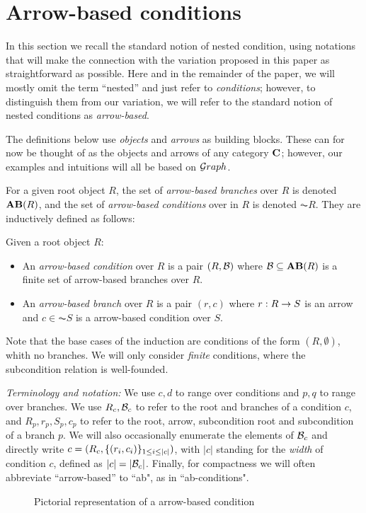 \section{Arrow-based conditions}
 
In this section we recall the standard notion of nested condition, using notations that will make the connection with the variation proposed in this paper as straightforward as possible. Here and in the remainder of the paper, we will mostly omit the term ``nested'' and just refer to \emph{conditions}; however, to distinguish them from our variation, we will refer to the standard notion of nested conditions as \emph{arrow-based}.

The definitions below use \emph{objects} and \emph{arrows} as building blocks. These can for now be thought of as the objects and arrows of any category $\mathbf{C}$; however, our examples and intuitions will all be based on ${\mathcal Graph}$.

For a given root object $R$, the set of \emph{arrow-based branches} over $R$ is denoted $\AB{R}$, and the set of \emph{arrow-based conditions} over in $R$ is denoted $\AC R$. They are inductively defined as follows:

\begin{definition}
  Given a root object $R$:
  \begin{itemize}
  \item An \emph{arrow-based condition} over $R$ is a pair $(R,\mathcal{B})$ where $\cB\subseteq \AB R$ is a finite set of arrow-based branches over $R$.
  \item An \emph{arrow-based branch} over $R$ is a pair $(r,c)$ where $r: R\rightarrow S$ is an arrow and $c\in \AC S$ is a arrow-based condition over $S$.
  \end{itemize}
\end{definition}
%

Note that the base cases of the induction are conditions of the form $(R,\emptyset)$, whith no branches. We will only consider \emph{finite} conditions, where the subcondition relation is well-founded.%



\emph{Terminology and notation:} We use $c,d$ to range over conditions and $p,q$ to range over branches. We use $R_c,\mathcal{B}_c$ to refer to the root and branches of a condition $c$, and $R_p,r_p,S_p,c_p$ to refer to the root, arrow, subcondition root and subcondition of a branch $p$. We will also occasionally enumerate the elements of $\mathcal{B}_c$ and directly write $c=(R_c, \{{(r_i, c_i)}\}_{1\leq i\leq |c|})$, with $|c|$ standing for the \emph{width} of condition $c$, defined as $|c|=|\mathcal{B}_c|$. Finally, for compactness we will often abbreviate ``arrow-based'' to ``ab", as in ``ab-conditions".
%
\begin{figure}
  \centering
  
  \caption{Pictorial representation of a arrow-based condition}
\end{figure}

